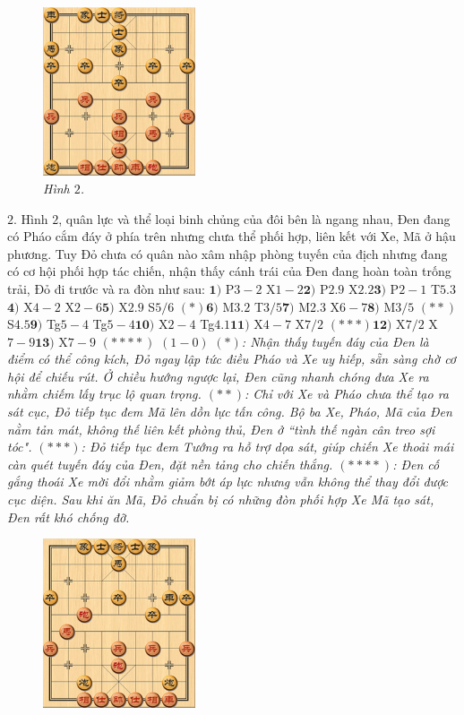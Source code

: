 \begin{multicols}{2}
\begin{figure}[H]
		\includegraphics[width= 0.4\textwidth]{2}
		\caption{\small\textit{\color{gocco}Hình $2$.}}
		\vspace*{-10pt}
	\end{figure}
	$2.$ Hình $2$, quân lực và thể loại binh chủng của đôi bên là ngang nhau, Đen đang có Pháo cắm đáy ở phía trên nhưng chưa thể phối hợp, liên kết với Xe, Mã ở hậu phương. Tuy Đỏ chưa có quân nào xâm nhập phòng tuyến của địch nhưng đang có cơ hội phối hợp tác chiến, nhận thấy cánh trái của Đen đang hoàn toàn trống trải, Đỏ đi trước và ra đòn như sau:
	\vskip 0.1cm
	$\pmb{1)}$ P$3-2$ X$1-2$\quad  $\pmb{2)}$ P$2.9$ X$2.2$\quad $\pmb{3)}$ P$2-1$ T$5.3$\quad $\pmb{4)}$ X$4-2$ X$2-6$\quad $\pmb{5)}$ X$2.9$ S$5/6$ $(*)$\quad $\pmb{6)}$ M$3.2$ T$3/5$\quad $\pmb{7)}$ M$2.3$ X$6-7$\quad  $\pmb{8)}$ M$3/5$ $(**)$ S$4.5$\quad $\pmb{9)}$ Tg$5-4$ Tg$5-4$\quad $\pmb{10)}$ X$2-4$ Tg$4.1$\quad $\pmb{11)}$ X$4-7$ X$7/2$ $(***)$\quad $\pmb{12)}$ X$7/2$ X$7-9$\quad $\pmb{13)}$ X$7-9$ $(****)$ $(1-0)$
	\vskip 0.1cm
	\textit{$(*)$: Nhận thấy tuyến đáy của Đen là điểm có thể công kích, Đỏ ngay lập tức điều Pháo và Xe uy hiếp, sẵn sàng chờ cơ hội để chiếu rút. Ở chiều hướng ngược lại, Đen cũng nhanh chóng đưa Xe ra nhằm chiếm lấy trục lộ quan trọng.
	\vskip 0.1cm
	$(**)$: Chỉ với Xe và Pháo chưa thể tạo ra sát cục, Đỏ tiếp tục đem Mã lên dồn lực tấn công. Bộ ba Xe, Pháo, Mã của Đen nằm tản mát, không thế liên kết phòng thủ, Đen ở ``tình thế ngàn cân treo sợi tóc".
	\vskip 0.1cm
	$(***)$: Đỏ tiếp tục đem Tướng ra hỗ trợ dọa sát, giúp chiến Xe thoải mái càn quét tuyến đáy của Đen, đặt nền tảng cho chiến thắng.
	\vskip 0.1cm
	$(****)$: Đen cố gắng thoái Xe mời đổi nhằm giảm bớt áp lực nhưng vẫn không thể thay đổi được cục diện. Sau khi ăn Mã, Đỏ chuẩn bị có những đòn phối hợp Xe Mã tạo sát, Đen rất khó chống đỡ.}
	\begin{figure}[H]
		\vspace*{-5pt}
		\centering
		\captionsetup{labelformat= empty, justification=centering}
		\includegraphics[width= 0.4\textwidth]{3}

\end{figure}
\end{multicols}
